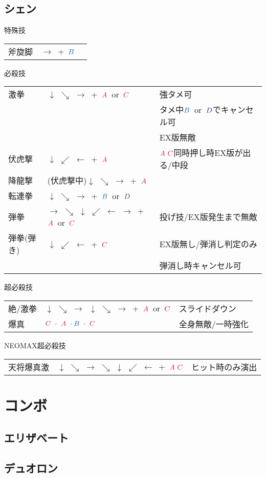 \documentclass[a4j,11pt]{jarticle}
\def\A{\textcolor{Acolor}{A}}
\def\C{\textcolor{Ccolor}{C}}
\def\B{\textcolor{Bcolor}{B}}
\def\D{\textcolor{Dcolor}{D}}
\def\hado{$\downarrow$ $\searrow$ $\rightarrow$}%
\def\tatsu{$\downarrow$ $\swarrow$ $\leftarrow$}%
\def\tenti{$\rightarrow$ $\searrow$ $\downarrow$ $\swarrow$ $\leftarrow$ $\rightarrow$}%
\def\ryuko{$\downarrow$ $\searrow$ $\rightarrow$ $\searrow$ $\downarrow$ $\swarrow$ $\leftarrow$}%
\begin{document}
\subsection{シェン}
\begin{itembox}[l]{特殊技}
\begin{tabular}{lll}
斧旋脚&$\rightarrow$\ +\ $\B$&%
\end{tabular}
\end{itembox}
\begin{itembox}[l]{必殺技}
\begin{tabular}{lll}
激拳&\hado\ +\ $\A$\ or\ $\C$&強タメ可\\
&&タメ中$\B$\ or\ $\D$でキャンセル可\\%
&&EX版無敵\\
伏虎撃&\tatsu\ +\ $\A$&$\A\ \C$同時押し時EX版が出る/中段\\%
降龍撃&(伏虎撃中)\hado\ +\ $\A$&\\%
転連拳&\hado\ +\ $\B$\ or\ $\D$&\\%
弾拳&\tenti\ +\ $\A$\ or\ $\C$&投げ技/EX版発生まで無敵\\%
弾拳(弾き)&\tatsu\ +\ $\C$&EX版無し/弾消し判定のみ\\%
&&弾消し時キャンセル可
\end{tabular}
\end{itembox}
\begin{itembox}[l]{超必殺技}
\begin{tabular}{lll}
絶/激拳&\hado\ \hado\ +\ $\A$\ or\ $\C$&スライドダウン\\%
爆真&$\C\ \cdot\ \A\ \cdot \B\ \cdot\ \C$&全身無敵/一時強化%
\end{tabular}
\end{itembox}
\begin{itembox}[l]{NEOMAX超必殺技}
\begin{tabular}{lll}
天将爆真激&\ryuko\ +\ $\A\ \C$&ヒット時のみ演出%
\end{tabular}
\end{itembox}
\newpage
\section{コンボ}
\subsection{エリザベート}
\subsection{デュオロン}
\end{document}
